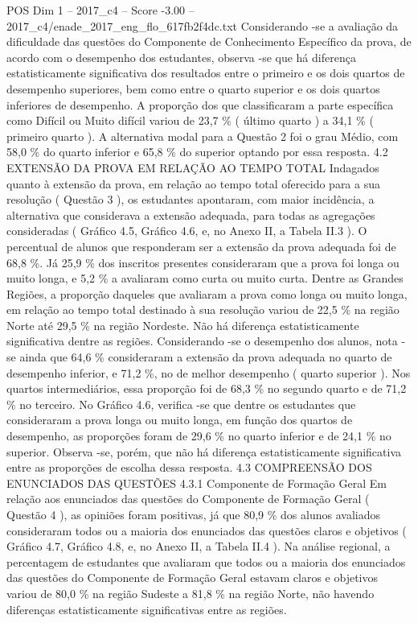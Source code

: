 \begin{textsample}{POS Dim 1 – 2017\_c4 – Score -3.00 – 2017\_c4/enade\_2017\_eng\_flo\_617fb2f4dc.txt}
Considerando -se a avaliação da dificuldade das questões do Componente de Conhecimento Específico da prova, de acordo com o desempenho dos estudantes, observa -se que há diferença estatisticamente significativa dos resultados entre o primeiro e os dois quartos de desempenho superiores, bem como entre o quarto superior e os dois quartos inferiores de desempenho.
A proporção dos que classificaram a parte específica como Difícil ou Muito difícil variou de 23,7 \% ( último quarto ) a 34,1 \% ( primeiro quarto ).
A alternativa modal para a Questão 2 foi o grau Médio, com 58,0 \% do quarto inferior e 65,8 \% do superior optando por essa resposta. 4.2 EXTENSÃO DA PROVA EM RELAÇÃO AO TEMPO TOTAL Indagados quanto à extensão da prova, em relação ao tempo total oferecido para a sua resolução ( Questão 3 ), os estudantes apontaram, com maior incidência, a alternativa que considerava a extensão adequada, para todas as agregações consideradas ( Gráfico 4.5, Gráfico 4.6, e, no Anexo II, a Tabela II.3 ).
O percentual de alunos que responderam ser a extensão da prova adequada foi de 68,8 \%.
Já 25,9 \% dos inscritos presentes consideraram que a prova foi longa ou muito longa, e 5,2 \% a avaliaram como curta ou muito curta.
Dentre as Grandes Regiões, a proporção daqueles que avaliaram a prova como longa ou muito longa, em relação ao tempo total destinado à sua resolução variou de 22,5 \% na região Norte até 29,5 \% na região Nordeste.
Não há diferença estatisticamente significativa dentre as regiões.
Considerando -se o desempenho dos alunos, nota -se ainda que 64,6 \% consideraram a extensão da prova adequada no quarto de desempenho inferior, e 71,2 \%, no de melhor desempenho ( quarto superior ).
Nos quartos intermediários, essa proporção foi de 68,3 \% no segundo quarto e de 71,2 \% no terceiro.
No Gráfico 4.6, verifica -se que dentre os estudantes que consideraram a prova longa ou muito longa, em função dos quartos de desempenho, as proporções foram de 29,6 \% no quarto inferior e de 24,1 \% no superior.
Observa -se, porém, que não há diferença estatisticamente significativa entre as proporções de escolha dessa resposta. 4.3 COMPREENSÃO DOS ENUNCIADOS DAS QUESTÕES 4.3.1 Componente de Formação Geral Em relação aos enunciados das questões do Componente de Formação Geral ( Questão 4 ), as opiniões foram positivas, já que 80,9 \% dos alunos avaliados consideraram todos ou a maioria dos enunciados das questões claros e objetivos ( Gráfico 4.7, Gráfico 4.8, e, no Anexo II, a Tabela II.4 ).
Na análise regional, a percentagem de estudantes que avaliaram que todos ou a maioria dos enunciados das questões do Componente de Formação Geral estavam claros e objetivos variou de 80,0 \% na região Sudeste a 81,8 \% na região Norte, não havendo diferenças estatisticamente significativas entre as regiões.

\end{textsample}
